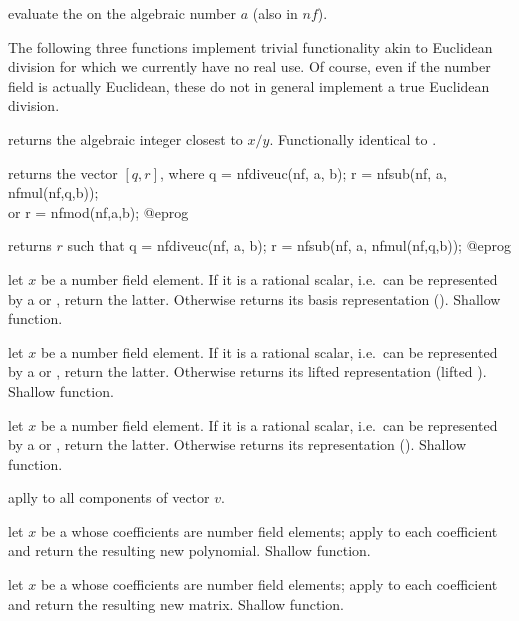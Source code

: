  evaluate the
  on the algebraic number $a$ (also in $nf$).

The following three functions implement trivial functionality akin to
Euclidean division for which we currently have no real use. Of course, even if
the number field is actually Euclidean, these do not in general implement a
true Euclidean division.

 returns the algebraic integer
closest to $x / y$. Functionally identical to .

 returns the vector $[q,r]$, where
\bprog
  q = nfdiveuc(nf, a, b);
  r = nfsub(nf, a, nfmul(nf,q,b));    \\ or r = nfmod(nf,a,b);
@eprog

 returns $r$ such that
\bprog
  q = nfdiveuc(nf, a, b);
  r = nfsub(nf, a, nfmul(nf,q,b));
@eprog

 let $x$ be a number field
element. If it is a rational scalar, i.e.~can be represented by a 
or , return the latter. Otherwise returns its basis representation
(). Shallow function.

 let $x$ be a number field
element. If it is a rational scalar, i.e.~can be represented by a 
or , return the latter. Otherwise returns its lifted 
representation (lifted ). Shallow function.

 let $x$ be a number field
element. If it is a rational scalar, i.e.~can be represented by a 
or , return the latter. Otherwise returns its 
representation (). Shallow function.

 aplly 
to all components of vector $v$.

 let $x$ be a  whose coefficients
are number field elements; apply  to each
coefficient and return the resulting new polynomial. Shallow function.

 let $x$ be a  whose coefficients
are number field elements; apply  to each
coefficient and return the resulting new matrix. Shallow function.

